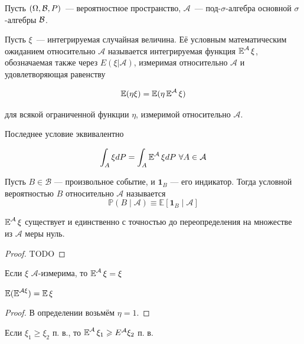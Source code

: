 Пусть $(\Omega, \mathcal{B}, P)$~--- вероятностное пространство, $\mathcal{A}$~--- под-$\sigma$-алгебра основной $\sigma$-алгебры $\mathcal{B}$.

\begin{definition}
    Пусть $\xi$~--- интегрируемая случайная величина. Её условным математическим ожиданием относительно $\mathcal{A}$ называется интегрируемая функция $\operatorname{\mathbb{E}}^{\mathcal{A}} \xi$, обозначаемая также через $E(\xi|\mathcal{A})$, измеримая относительно $\mathcal{A}$ и удовлетворяющая равенству

    \[
    \operatorname{\mathbb{E}}(\eta \xi)  = \operatorname{\mathbb{E}}(\eta \operatorname{\mathbb{E}}^{\mathcal{A}} \xi)
    \]

    для всякой ограниченной функции $\eta$, измеримой относительно $\mathcal{A}$.

    Последнее условие эквивалентно

    \[
    \int_A \xi dP = \int_A \operatorname{\mathbb{E}}^{\mathcal{A}} \xi dP \ \forall A \in \mathcal{A}
    \]
\end{definition}

\begin{definition}
    Пусть $B \in {\mathcal{B}}$ — произвольное событие, и $\mathbf{1}_{B}$ — его индикатор. Тогда условной вероятностью $B$ относительно ${\mathcal{A}}$ называется $$\mathbb{P}(B \mid {\mathcal{A}}) \equiv \mathbb{E} [\mathbf {1}_{B} \mid {\mathcal{A}}]$$
\end{definition}

\begin{statement}
    $\operatorname{\mathbb{E}}^{\mathcal{A}} \xi$ существует и единственно с точностью до переопределения на множестве из $\mathcal{A}$ меры нуль.
\end{statement}

\begin{proof}
    TODO
\end{proof}

\begin{statement}
    Если $\xi$ $\mathcal{A}$-измерима, то $\operatorname{\mathbb{E}}^{\mathcal{A}} \xi = \xi$
\end{statement}

\begin{statement}
    $\operatorname{\mathbb{E}}(\operatorname{\mathbb{E}}^{\mathcal{A} \xi}) = \operatorname{\mathbb{E}} \xi$
\end{statement}

\begin{proof}
    В определении возьмём $\eta = 1$.
\end{proof}

\begin{statement}
    Если $\xi_1 \geq \xi_2$ п. в., то 
    $\operatorname{\mathbb{E}}^{\mathcal{A}} \xi_1 \geqslant E^{\mathcal{A}} \xi_2$ п. в.
\end{statement}

